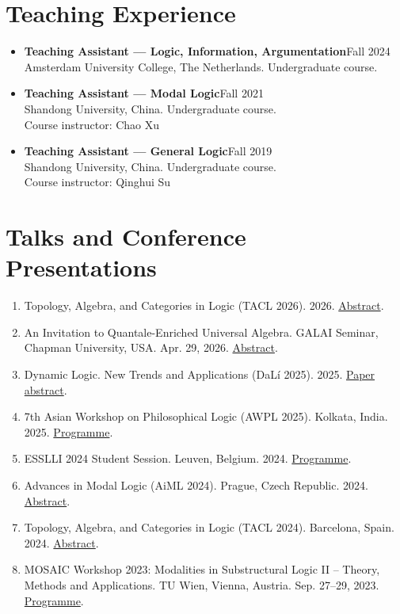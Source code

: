 \documentclass[11pt,a4paper]{article}
\begin{document}
\section*{Teaching Experience}
\begin{itemize}
\item \textbf{Teaching Assistant --- Logic, Information, Argumentation}\hfill Fall 2024\\
Amsterdam University College, The Netherlands. Undergraduate course.
\item \textbf{Teaching Assistant --- Modal Logic}\hfill Fall 2021\\
Shandong University, China. Undergraduate course.\\
Course instructor: Chao Xu
\item \textbf{Teaching Assistant --- General Logic}\hfill Fall 2019\\
Shandong University, China. Undergraduate course.\\
Course instructor: Qinghui Su
\end{itemize}

\section*{Talks and Conference Presentations}
\begin{enumerate}
\item Topology, Algebra, and Categories in Logic (TACL 2026). 2026.
\href{https://iphils.uj.edu.pl/tacl/Booklet.pdf\#page=172}{Abstract}.
\item \textnormal{An Invitation to Quantale-Enriched Universal Algebra}. GALAI Seminar,
Chapman University, USA. Apr. 29, 2026.
\href{https://sites.google.com/chapman.edu/galai/previous-semesters/spring-2026\#:~:text=An\%20Invitation\%20to\%20Quantale-Enriched\%20Universal\%20Algebra}{Abstract}.
\item Dynamic Logic. New Trends and Applications (DaL\'{i} 2025). 2025.
\href{https://doi.org/10.1007/978-3-032-22626-6_2}{Paper abstract}.
\item 7th Asian Workshop on Philosophical Logic (AWPL 2025). Kolkata, India. 2025.
\href{https://sites.google.com/view/awpl2025/schedule}{Programme}.
\item ESSLLI 2024 Student Session. Leuven, Belgium. 2024.
\href{https://2024.esslli.eu/placeholder-programme/student-session.html\#:~:text=Yiwen\%20Ding}{Programme}.
\item Advances in Modal Logic (AiML 2024). Prague, Czech Republic. 2024.
\href{https://easychair.org/smart-program/AiML2024/2024-08-23.html\#talk:264096}{Abstract}.
\item Topology, Algebra, and Categories in Logic (TACL 2024). Barcelona, Spain. 2024.
\href{https://iiia.csic.es/tacl2024/abstracts/conference/contributed/TACL_2024_paper_75.pdf}{Abstract}.
\item MOSAIC Workshop 2023: Modalities in Substructural Logic II -- Theory, Methods and Applications. TU Wien, Vienna, Austria. Sep. 27--29, 2023.
\href{https://sites.google.com/view/mosaic2023/program/schedule}{Programme}.
\end{enumerate}
\end{document}
